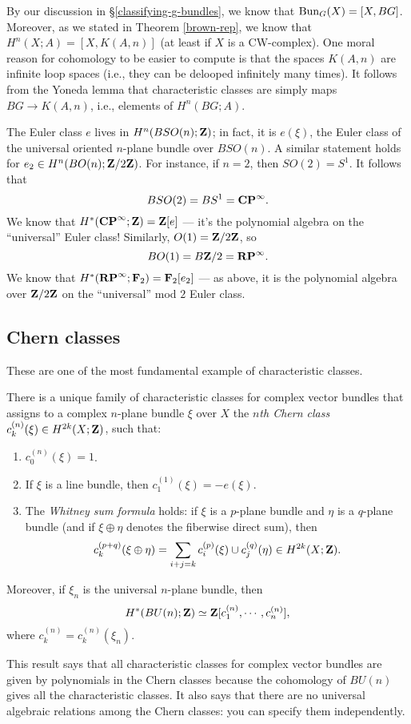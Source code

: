 By our discussion in \S \ref{classifying-g-bundles}, we know that $\mathrm{Bun}_G(X) =
[X,BG]$. Moreover, as we stated in Theorem \ref{brown-rep}, we know that
$H^n(X;A) = [X,K(A,n)]$ (at least if $X$ is a CW-complex). One moral reason for
cohomology to be easier to compute is that the spaces $K(A,n)$ are infinite
loop spaces (i.e., they can be delooped infinitely many times). It follows from
the Yoneda lemma that characteristic classes are simply maps $BG\to K(A,n)$,
i.e., elements of $H^n(BG;A)$.

\begin{example}
    The Euler class $e$ lives in $H^n(BSO(n);\mathbf Z)$; in fact, it is $e(\xi)$, the
    Euler class of the universal oriented $n$-plane bundle over $BSO(n)$. A
    similar statement holds for $e_2\in H^n(BO(n);\mathbf Z/2\mathbf Z)$. For instance, if
    $n=2$, then $SO(2) = S^1$. It follows that
    $$BSO(2) = BS^1 = \mathbf{CP}^\infty.$$
    We know that $H^\ast(\mathbf{CP}^\infty;\mathbf Z) = \mathbf Z[e]$ --- it's the polynomial
    algebra on the ``universal'' Euler class! Similarly, $O(1) = \mathbf Z/2\mathbf Z$, so
    $$BO(1) = B\mathbf Z/2 = \mathbf{RP}^\infty.$$
    We know that $H^\ast(\mathbf{RP}^\infty;\mathbf F_2) = \mathbf F_2[e_2]$ --- as above, it is
    the polynomial algebra over $\mathbf Z/2\mathbf Z$ on the ``universal'' mod $2$ Euler
    class.
\end{example}

\subsection{Chern classes}
These are one of the most fundamental example of characteristic classes.
\begin{theorem}\label{chern-classes}
    There is a unique family of characteristic classes for complex vector
    bundles that assigns to a complex $n$-plane bundle $\xi$ over $X$ the
    \emph{$n$th Chern class} $c^{(n)}_k(\xi)\in H^{2k}(X;\mathbf Z)$, such that:
    \begin{enumerate}
	\item $c^{(n)}_0(\xi) = 1$.
	\item If $\xi$ is a line bundle, then $c^{(1)}_1(\xi) = -e(\xi)$.
	\item The \emph{Whitney sum formula} holds: if $\xi$ is a $p$-plane
	    bundle and $\eta$ is a $q$-plane bundle (and if $\xi\oplus\eta$
	    denotes the fiberwise direct sum), then
	    \begin{equation*}
		c^{(p+q)}_k(\xi\oplus \eta) = \sum_{i+j=k} c^{(p)}_i(\xi)\cup
		c^{(q)}_j(\eta) \in H^{2k}(X;\mathbf Z).
	    \end{equation*}
    \end{enumerate}
    Moreover, if $\xi_n$ is the universal $n$-plane bundle, then
    $$H^\ast(BU(n);\mathbf Z) \simeq \mathbf Z[c_1^{(n)}, \cdots, c^{(n)}_n],$$
    where $c^{(n)}_k = c^{(n)}_k(\xi_n)$.
\end{theorem}
This result says that all characteristic classes for complex vector bundles are
given by polynomials in the Chern classes because the cohomology of $BU(n)$
gives all the characteristic classes.  It also says that there are no universal
algebraic relations among the Chern classes: you can specify them
independently.

